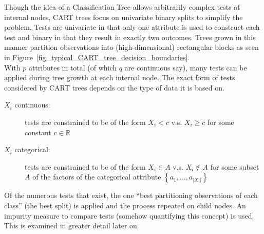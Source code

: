 Though the idea of a Classification Tree allows arbitrarily complex tests at internal nodes, CART trees focus on univariate binary splits to simplify the problem. Tests are univariate in that only one attribute is used to construct each test and binary in that they result in exactly two outcomes. Trees grown in this manner partition observations into (high-dimensional) rectangular blocks as seen in Figure~\ref{fig_typical_CART_tree_decision_boundaries}.\\

With $p$ attributes in total (of which $q$ are continuous say), many tests can be applied during tree growth at each internal node. The exact form of tests considered by CART trees depends on the type of data it is based on.
\begin{description}
\item[$X_i$ continuous:] tests are constrained to be of the form $X_i<c$ v.s. $X_i\geq c$ for some constant $c\in\mathbb{R}$
\item[$X_i$ categorical:] tests are constrained to be of the form $X_i\in A$ v.s. $X_i\notin A$ for some subset $A$ of the factors of the categorical attribute $\left\{a_1,\ldots,a_{|X_i|}\right\}$ 
\end{description}
Of the numerous tests that exist, the one ``best partitioning observations of each class'' (the best split) is applied and the process repeated on child nodes. An impurity measure to compare tests (somehow quantifying this concept) is used. This is examined in greater detail later on.\\

